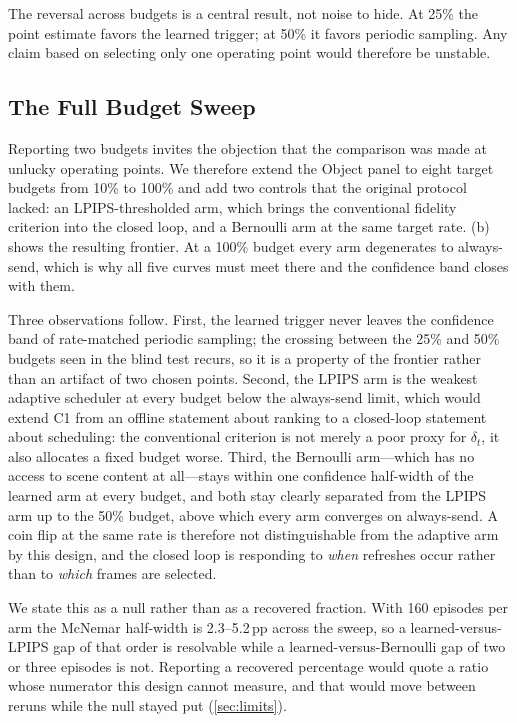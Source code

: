 \documentclass[sigconf,10pt,anonymous,review]{acmart}
\newcommand{\dt}{\delta_t}
\newcommand{\pp}{\,pp}
\begin{document}
The reversal across budgets is a central result, not noise to hide. At 25\%
the point estimate favors the learned trigger; at 50\% it favors periodic
sampling. Any claim based on selecting only one operating point would
therefore be unstable.

\subsection{The Full Budget Sweep}
Reporting two budgets invites the objection that the comparison was made at
unlucky operating points. We therefore extend the Object panel to eight
target budgets from 10\% to 100\% and add two controls that the original
protocol lacked: an LPIPS-thresholded arm, which brings the conventional
fidelity criterion into the closed loop, and a Bernoulli arm at the same
target rate. (b) shows the resulting frontier. At a 100\% budget every arm degenerates to always-send, which is why all five
curves must meet there and the confidence band closes with them.

Three observations follow. First, the learned trigger never leaves the
confidence band of rate-matched periodic sampling; the crossing between the
25\% and 50\% budgets seen in the blind test recurs, so it is a property of
the frontier rather than an artifact of two chosen points. Second,
the LPIPS arm is the weakest adaptive scheduler at every budget
below the always-send limit, which would extend \textsf{C1} from an offline statement about
ranking to a closed-loop statement about scheduling: the conventional
criterion is not merely a poor proxy for $\dt$, it also allocates a fixed
budget worse. Third, the Bernoulli arm---which has no access to
scene content at all---stays within one confidence half-width of the learned
arm at every budget, and both stay clearly separated from the LPIPS arm up to
the 50\% budget, above which every arm converges on always-send.
A coin flip at the same rate is therefore not distinguishable from the
adaptive arm by this design, and the closed loop is responding to \emph{when}
refreshes occur rather than to \emph{which} frames are selected.

We state this as a null rather than as a recovered fraction. With 160 episodes
per arm the McNemar half-width is 2.3--5.2\pp{} across the sweep, so a
learned-versus-LPIPS gap of that order is resolvable while a
learned-versus-Bernoulli gap of two or three episodes is not. Reporting a
recovered percentage would quote a ratio whose numerator this design cannot
measure, and that would move between reruns while the null stayed put
(\cref{sec:limits}).
\end{document}
